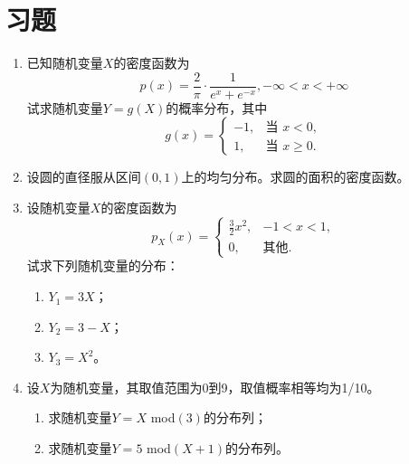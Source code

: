 \section{习题}
\begin{enumerate}
    \item 已知随机变量$X$的密度函数为
$$
 p(x) = \frac{2}{\pi}\cdot \frac{1}{e^x+e^{-x}},     -\infty < x < +\infty
$$
试求随机变量$Y = g(X)$的概率分布，其中
$$
 g(x) = \left. 
	 \begin{cases}
	 -1, & \text{当 } x < 0,\\
	 1, & \text{当 } x \geq 0 .
	 \end{cases} 
	 \right.
$$

\item 设圆的直径服从区间$(0,1)$上的均匀分布。求圆的面积的密度函数。

\item 设随机变量$X$的密度函数为
$$p_X(x) =\left\{ 
	 \begin{aligned}
	      \frac{3}{2}x^2, & -1 < x < 1,\\
	 0, & \text{其他}.
	 \end{aligned}
	\right.
$$
试求下列随机变量的分布：
\begin{enumerate}
\item $Y_1 = 3X$；
\item $Y_2 = 3-X$； 
\item $Y_3 = X^2$。
\end{enumerate}

\item 设$X$为随机变量，其取值范围为0到9，取值概率相等均为1/10。
\begin{enumerate}
    \item 求随机变量$Y = X$ mod$(3)$的分布列；
    \item 求随机变量$Y = 5$ mod$(X+1)$的分布列。
\end{enumerate}

\end{enumerate}